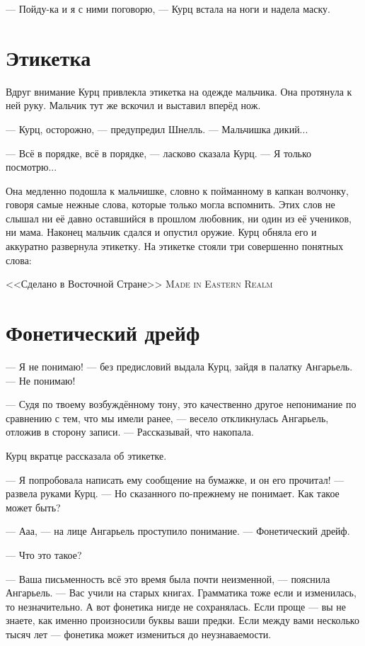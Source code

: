 --- Пойду-ка и я с ними поговорю, --- Курц встала на ноги и надела маску.

\section{Этикетка}

Вдруг внимание Курц привлекла этикетка на одежде мальчика.
Она протянула к ней руку.
Мальчик тут же вскочил и выставил вперёд нож.

--- Курц, осторожно, --- предупредил Шнелль.
--- Мальчишка дикий...

--- Всё в порядке, всё в порядке, --- ласково сказала Курц.
--- Я только посмотрю...

Она медленно подошла к мальчишке, словно к пойманному в капкан волчонку, говоря самые нежные слова, которые только могла вспомнить.
Этих слов не слышал ни её давно оставшийся в прошлом любовник, ни один из её учеников, ни мама.
Наконец мальчик сдался и опустил оружие.
Курц обняла его и аккуратно развернула этикетку.
На этикетке стояли три совершенно понятных слова:

{<<Сделано в Восточной Стране>>}
{\textsc{Made in Eastern Realm}}

\section{Фонетический дрейф}

--- Я не понимаю! --- без предисловий выдала Курц, зайдя в палатку Ангарьель.
--- Не понимаю!

--- Судя по твоему возбуждённому тону, это качественно другое непонимание по сравнению с тем, что мы имели ранее, --- весело откликнулась Ангарьель, отложив в сторону записи.
--- Рассказывай, что накопала.

Курц вкратце рассказала об этикетке.

--- Я попробовала написать ему сообщение на бумажке, и он его прочитал! --- развела руками Курц.
--- Но сказанного по-прежнему не понимает.
Как такое может быть?

--- Ааа, --- на лице Ангарьель проступило понимание.
--- Фонетический дрейф.

--- Что это такое?

--- Ваша письменность всё это время была почти неизменной, --- пояснила Ангарьель.
--- Вас учили на старых книгах.
Грамматика тоже если и изменилась, то незначительно.
А вот фонетика нигде не сохранялась.
Если проще --- вы не знаете, как именно произносили буквы ваши предки.
Если между вами несколько тысяч лет --- фонетика может измениться до неузнаваемости.

